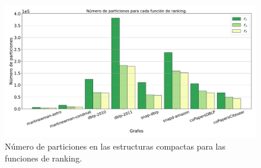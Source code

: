 \begin{figure}
    	\centering
    	\includegraphics[width=1\linewidth]{img/Npartitions3.pdf}
    	
    \caption{Número de particiones en las estructuras compactas para las funciones de ranking.}
    \label{fig:nPartitions}
\end{figure}
